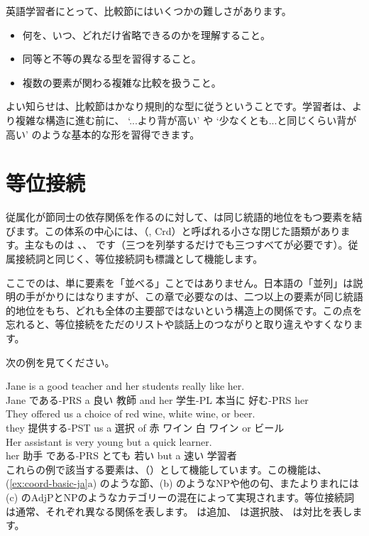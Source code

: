 英語学習者にとって、比較節にはいくつかの難しさがあります。
\begin{itemize}[noitemsep]
    \item 何を、いつ、どれだけ省略できるのかを理解すること。
    \item 同等と不等の異なる型を習得すること。
    \item 複数の要素が関わる複雑な比較を扱うこと。
\end{itemize}

よい知らせは、比較節はかなり規則的な型に従うということです。学習者は、より複雑な構造に進む前に、 `...より背が高い' や  `少なくとも...と同じくらい背が高い' のような基本的な形を習得できます。

\section{等位接続}\label{sec:coordination-ja}

従属化が節同士の依存関係を作るのに対して、は同じ統語的地位をもつ要素を結びます。この体系の中心には、（, Crd）と呼ばれる小さな閉じた語類があります。主なものは 、、 です（三つを列挙するだけでも三つすべてが必要です）。従属接続詞と同じく、等位接続詞も標識として機能します。

ここでのは、単に要素を「並べる」ことではありません。日本語の「並列」は説明の手がかりにはなりますが、この章で必要なのは、二つ以上の要素が同じ統語的地位をもち、どれも全体の主要部ではないという構造上の関係です。この点を忘れると、等位接続をただのリストや談話上のつながりと取り違えやすくなります。

次の例を見てください。

\ea \label{ex:coord-basic-ja}
    \ea \gll {\ob}Jane is a good teacher{\cb} {\ob}and her students really like her{\cb}.\\
        Jane である-PRS a 良い 教師 and her 学生-PL 本当に 好む-PRS her\\
    \glt {}
    \ex \gll They offered us a choice of {\ob}red wine{\cb}, {\ob}white wine{\cb}, {\ob}or beer{\cb}.\\
        they 提供する-PST us a 選択 of 赤 ワイン 白 ワイン or ビール\\
    \glt {}
    \ex \gll Her assistant is {\ob}very young{\cb} {\ob}but a quick learner{\cb}.\\
        her 助手 である-PRS とても 若い but a 速い 学習者\\
    \glt {}
    \z
\z
これらの例で該当する要素は、（）として機能しています。この機能は、(\ref{ex:coord-basic-ja}a) のような節、(b) のようなNPや他の句、またよりまれには (c) のAdjPとNPのようなカテゴリーの混在によって実現されます。等位接続詞は通常、それぞれ異なる関係を表します。 は追加、 は選択肢、 は対比を表します。

